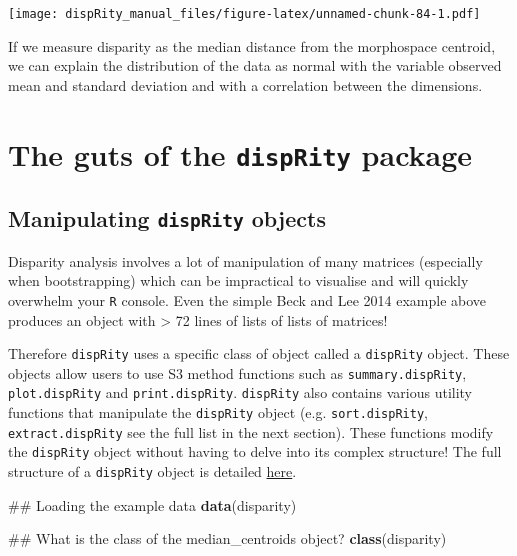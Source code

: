 \documentclass[]{book}
\newenvironment{Shaded}{\begin{snugshade}}{\end{snugshade}}
\newcommand{\KeywordTok}[1]{\textcolor[rgb]{0.13,0.29,0.53}{\textbf{#1}}}
\newcommand{\NormalTok}[1]{#1}
\theoremstyle{definition}
\theoremstyle{definition}
\theoremstyle{remark}
\begin{document}
\texttt{[image: dispRity\_manual\_files/figure-latex/unnamed-chunk-84-1.pdf]}

If we measure disparity as the median distance from the morphospace
centroid, we can explain the distribution of the data as normal with the
variable observed mean and standard deviation and with a correlation
between the dimensions.

\chapter{\texorpdfstring{The guts of the \texttt{dispRity}
package}{The guts of the dispRity package}}\label{the-guts-of-the-disprity-package}

\section{\texorpdfstring{Manipulating \texttt{dispRity}
objects}{Manipulating dispRity objects}}\label{manipulating-disprity-objects}

Disparity analysis involves a lot of manipulation of many matrices
(especially when bootstrapping) which can be impractical to visualise
and will quickly overwhelm your \texttt{R} console. Even the simple Beck
and Lee 2014 example above produces an object with \textgreater{} 72
lines of lists of lists of matrices!

Therefore \texttt{dispRity} uses a specific class of object called a
\texttt{dispRity} object. These objects allow users to use S3 method
functions such as \texttt{summary.dispRity}, \texttt{plot.dispRity} and
\texttt{print.dispRity}. \texttt{dispRity} also contains various utility
functions that manipulate the \texttt{dispRity} object (e.g.
\texttt{sort.dispRity}, \texttt{extract.dispRity} see the full list in
the next section). These functions modify the \texttt{dispRity} object
without having to delve into its complex structure! The full structure
of a \texttt{dispRity} object is detailed
\href{https://github.com/TGuillerme/dispRity/blob/master/disparity_object.md}{here}.

\begin{Shaded}
\begin{Highlighting}[]
\NormalTok{## Loading the example data}
\KeywordTok{data}\NormalTok{(disparity)}

\NormalTok{## What is the class of the median_centroids object?}
\KeywordTok{class}\NormalTok{(disparity)}
\end{Highlighting}
\end{Shaded}
\end{document}
